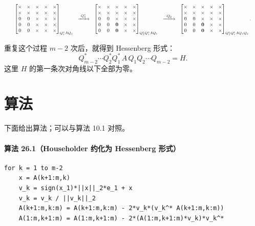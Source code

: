 \documentclass[UTF8,fontset=none,12pt]{ctexart}
\begin{document}
\[
\resizebox{0.98\textwidth}{!}{$
\begin{array}{c@{\quad\xrightarrow{\ Q_2^*\ }\quad}c@{\quad\xrightarrow{\ \cdot Q_2\ }\quad}c}
\begin{bmatrix}
\times&\times&\times&\times&\times\\
\times&\times&\times&\times&\times\\
0&0&\times&\times&\times\\
0&0&\times&\times&\times\\
0&0&\times&\times&\times
\end{bmatrix}_{Q_1^*AQ_1}
&
\begin{bmatrix}
\times&\times&\times&\times&\times\\
\times&\times&\times&\times&\times\\
0&0&\mathbf{\times}&\mathbf{\times}&\mathbf{\times}\\
0&0&\mathbf{0}&\mathbf{\times}&\mathbf{\times}\\
0&0&\mathbf{0}&\mathbf{\times}&\mathbf{\times}
\end{bmatrix}_{Q_2^*Q_1^*AQ_1}
&
\begin{bmatrix}
\times&\times&\mathbf{\times}&\mathbf{\times}&\mathbf{\times}\\
\times&\times&\mathbf{\times}&\mathbf{\times}&\mathbf{\times}\\
0&0&\mathbf{\times}&\mathbf{\times}&\mathbf{\times}\\
0&0&\mathbf{0}&\mathbf{\times}&\mathbf{\times}\\
0&0&\mathbf{0}&\mathbf{\times}&\mathbf{\times}
\end{bmatrix}_{Q_2^*Q_1^*AQ_1Q_2}.
\end{array}$}
\]

重复这个过程 $m-2$ 次后，就得到 Hessenberg 形式：
\[
 Q_{m-2}^*\cdots Q_2^*Q_1^*\,A\,Q_1Q_2\cdots Q_{m-2}=H.
\]
这里 $H$ 的第一条次对角线以下全部为零。

\section*{算法}

下面给出算法；可以与算法 10.1 对照。

\paragraph{算法 26.1（Householder 约化为 Hessenberg 形式）}
\begin{verbatim}
for k = 1 to m-2
    x = A(k+1:m,k)
    v_k = sign(x_1)*||x||_2*e_1 + x
    v_k = v_k / ||v_k||_2
    A(k+1:m,k:m) = A(k+1:m,k:m) - 2*v_k*(v_k^* A(k+1:m,k:m))
    A(1:m,k+1:m) = A(1:m,k+1:m) - 2*(A(1:m,k+1:m)*v_k)*v_k^*
\end{verbatim}
\end{document}
